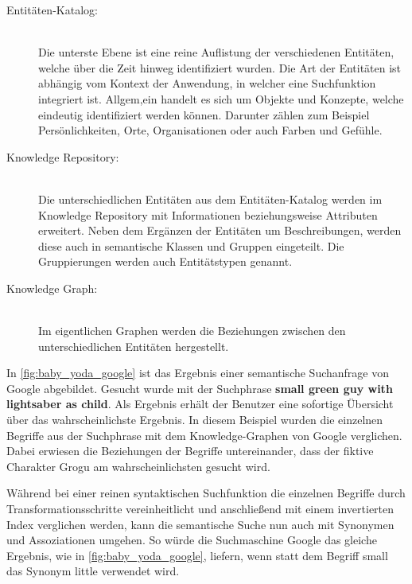\begin{description}
    \item[Entitäten-Katalog:]\hfill \\
    Die unterste Ebene ist eine reine Auflistung der verschiedenen Entitäten, welche über die Zeit hinweg identifiziert wurden. Die Art der Entitäten ist abhängig vom Kontext der Anwendung, in welcher eine Suchfunktion integriert ist. Allgem,ein handelt es sich um Objekte und Konzepte, welche eindeutig identifiziert werden können. Darunter zählen zum Beispiel Persönlichkeiten, Orte, Organisationen oder auch Farben und Gefühle.
    \item[Knowledge Repository:]\hfill \\
    Die unterschiedlichen Entitäten aus dem Entitäten-Katalog werden im Knowledge Repository mit Informationen beziehungsweise Attributen erweitert. Neben dem Ergänzen der Entitäten um Beschreibungen, werden diese auch in semantische Klassen und Gruppen eingeteilt. Die Gruppierungen werden auch Entitätstypen genannt.
    \item[Knowledge Graph:]\hfill \\
    Im eigentlichen Graphen werden die Beziehungen zwischen den unterschiedlichen Entitäten hergestellt.
\end{description}

In \autoref{fig:baby_yoda_google} ist das Ergebnis einer semantische Suchanfrage von Google abgebildet. Gesucht wurde mit der Suchphrase \glqq \textbf{small green guy with lightsaber as child}\grqq{}. Als Ergebnis erhält der Benutzer eine sofortige Übersicht über das wahrscheinlichste Ergebnis. In diesem Beispiel wurden die einzelnen Begriffe aus der Suchphrase mit dem Knowledge-Graphen von Google verglichen. Dabei erwiesen die Beziehungen der Begriffe untereinander, dass der fiktive Charakter \glqq Grogu\grqq{} am wahrscheinlichsten gesucht wird. 

Während bei einer reinen syntaktischen Suchfunktion die einzelnen Begriffe durch Transformationsschritte vereinheitlicht und anschließend mit einem invertierten Index verglichen werden, kann die semantische Suche nun auch mit Synonymen und Assoziationen umgehen. So würde die Suchmaschine Google das gleiche Ergebnis, wie in \autoref{fig:baby_yoda_google}, liefern, wenn statt dem Begriff \glqq small\grqq{} das Synonym \glqq little\grqq{} verwendet wird.

